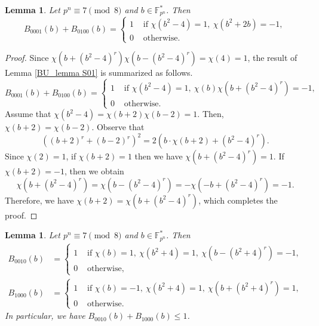 \documentclass[11pt]{article}
\numberwithin{theorem}{section}
\newtheorem{lemma}[theorem]{Lemma}
\newcommand{\Fpnmul}{\mathbb{F}_{p^n}^*}
\begin{document}
\begin{lemma}\label{BU_lemma S01+}
	Let $p^n\equiv 7\pmod{8}$ and $b\in \Fpnmul$. Then
	\begin{equation}\label{BU01}
		B_{0001}(b)+B_{0100}(b)=
		\begin{cases}
			1 &\text{ if }\chi(b^2-4)=1,\ \chi(b^2+2b)=-1,\\
			0 &\text{ otherwise.}
		\end{cases}
	\end{equation}
\end{lemma}
\begin{proof}
	Since $\chi(b+(b^2-4)^r)\chi(b-(b^2-4)^r)= \chi(4)=1$, the result of Lemma \ref{BU_lemma S01} is summarized as follows.
	\begin{equation}\label{BU01_eqn}
		B_{0001}(b)+B_{0100}(b)=
		\begin{cases}
			1 &\text{ if }\chi(b^2-4)=1,\ \chi(b)\chi(b+(b^2-4)^r)=-1,\\
			0 &\text{ otherwise.}
		\end{cases}
	\end{equation}
	Assume that $\chi(b^2-4)=\chi(b+2)\chi(b-2)=1$. Then, $\chi(b+2)=\chi(b-2)$. Observe that 
	\begin{equation*}
		\left( (b+2)^r + (b-2)^r\right)^2 = 2\left( b\cdot \chi(b+2) + (b^2-4)^r \right). 
	\end{equation*}
	Since $\chi(2)=1$, if $\chi(b+2)=1$ then we have $\chi(b+(b^2-4)^r)=1$. If $\chi(b+2)=-1$, then we obtain
	\begin{equation*}
		\chi(b+(b^2-4)^r) = \chi(b-(b^2-4)^r) = -\chi(-b+(b^2-4)^r) = -1.
	\end{equation*} 
	Therefore, we have $\chi(b+2) = \chi(b+(b^2-4)^r)$, which completes the proof. 
\end{proof}








\begin{lemma}\label{BU_lemma S10}
	Let $p^n\equiv 7\pmod{8}$ and $b\in \Fpnmul$. Then 
	\begin{align*}
		B_{0010}(b)&=
		\begin{cases}
			1 &\text{ if } \chi(b)=1,\ \chi(b^2+4)=1,\ \chi(b-(b^2+4)^r)=-1,\\
			0 &\text{ otherwise, } 
		\end{cases}\\
		B_{1000}(b)&=
		\begin{cases}
			1 &\text{ if } \chi(b)=-1,\ \chi(b^2+4)=1,\ \chi(b+(b^2+4)^r)=1,\\
			0 &\text{ otherwise. } 
		\end{cases}
	\end{align*}
	In particular, we have $B_{0010}(b)+B_{1000}(b)\le 1$.
\end{lemma}
\end{document}
